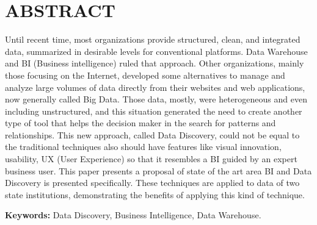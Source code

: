 \chapter*{\centering ABSTRACT}
	Until recent time, most organizations provide structured, clean, and integrated data, summarized in desirable levels for conventional platforms. Data Warehouse and BI (Business intelligence) ruled that approach. Other organizations, mainly those focusing on the Internet, developed some alternatives to manage and analyze large volumes of data directly from their websites and web applications, now generally called Big Data. Those data, mostly, were heterogeneous and even including unstructured, and this situation generated the need to create another type of tool that helps the decision maker in the search for patterns and relationships. This new approach, called Data Discovery, could not be equal to the traditional techniques also should have features like visual innovation, usability, UX (User Experience) so that it resembles a BI guided by an expert business user. This paper presents a proposal of state of the art area BI and Data Discovery is presented specifically. These techniques are applied to data of two state institutions, demonstrating the benefits of applying this kind of technique.


\vspace*{1\baselineskip}
\textbf{Keywords:} Data Discovery, Business Intelligence, Data Warehouse.